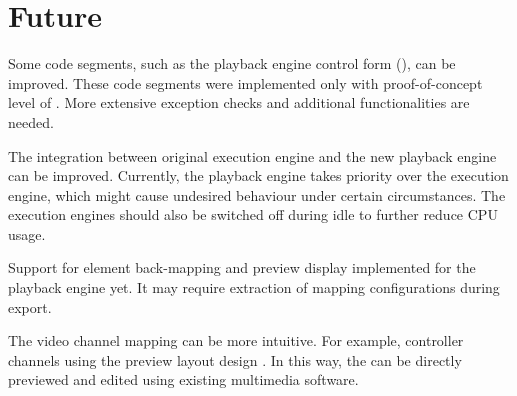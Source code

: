 \section{Future }

Some code segments, such as the playback engine control form (), can be improved. These code segments were implemented only with  proof-of-concept level of . More extensive exception checks and  additional functionalities are needed.

The integration between  original execution engine and the new playback engine can be improved. Currently, the playback engine takes priority over the execution engine, which might cause undesired behaviour under certain circumstances. The execution engines should also be switched off during idle to further reduce CPU usage.

Support for element back-mapping and preview display  implemented for the playback engine yet. It may require  extraction of mapping configurations during export.

The video channel mapping can be more intuitive. For example,  controller channels using the preview layout design . In this way, the  can be directly previewed and edited using existing multimedia software.

